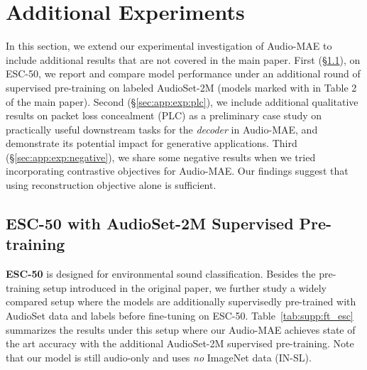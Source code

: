 \documentclass{article}
\renewcommand{\paragraph}[1]{\vspace{1.25mm}\noindent\textbf{#1}}
\begin{document}
\section{Additional Experiments}
\label{sec:app:exp}

In this section, we extend our experimental investigation of Audio-MAE to include additional results that are not covered in the main paper.
First (\S\ref{sec:app:exp:esc}), on ESC-50, we report and compare model performance under an additional round of supervised pre-training on labeled AudioSet-2M (models marked with  in Table 2 of the main paper).
Second (\S\ref{sec:app:exp:plc}), we include additional qualitative results on packet loss concealment (PLC) 
as a preliminary case study on practically useful downstream tasks for the \textit{decoder} in Audio-MAE, and demonstrate its potential impact for generative applications.
Third (\S\ref{sec:app:exp:negative}), we share some negative results when we tried incorporating contrastive objectives for Audio-MAE. Our findings suggest that using reconstruction objective alone is sufficient. 


\subsection{ESC-50 with AudioSet-2M Supervised Pre-training}
\label{sec:app:exp:esc}

\paragraph{ESC-50} is designed for environmental sound classification. Besides the pre-training setup introduced in the original paper, we further study a widely compared setup where the models are additionally supervisedly pre-trained with AudioSet data and labels before fine-tuning on ESC-50. Table~\ref{tab:supp:ft_esc} summarizes the results under this setup where our Audio-MAE achieves state of the art accuracy with the additional AudioSet-2M supervised pre-training. Note that our model is still audio-only and uses \emph{no} ImageNet data (IN-SL).
\end{document}
